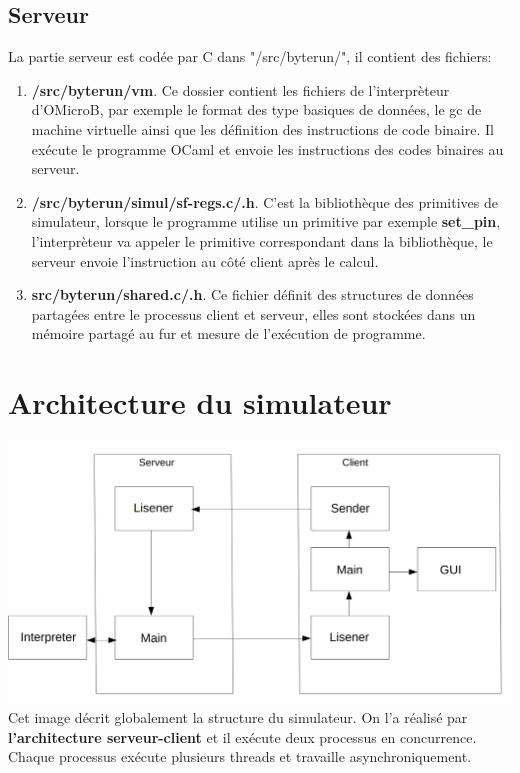\documentclass[14px]{article}
\begin{document}
\subsection{Serveur}
La partie serveur est codée par C dans "/src/byterun/", il contient des fichiers:
\begin{enumerate}
\item \textbf{/src/byterun/vm}. 
Ce dossier contient les fichiers de l'interprèteur d'OMicroB, par exemple le format des type basiques de données, le gc de machine virtuelle ainsi que les définition des instructions de code binaire. Il exécute le programme OCaml et envoie les instructions des codes binaires au serveur.

\item \textbf{/src/byterun/simul/sf-regs.c/.h}. 
C'est la bibliothèque des primitives de simulateur, lorsque le programme utilise un primitive par exemple \textbf{set\_pin}, l'interprèteur va appeler le primitive correspondant dans la bibliothèque, le serveur envoie l'instruction au côté client après le calcul.

\item \textbf{src/byterun/shared.c/.h}. 
Ce fichier définit des structures de données partagées
entre le processus client et serveur, elles sont stockées dans un mémoire partagé au fur et mesure de l'exécution de programme.
\end{enumerate}


\clearpage
\pagestyle{fancy}
\rhead{\thepage}
\fancyfoot{}
\section{Architecture du simulateur}
\includegraphics[width=\textwidth]{simulator.png}\\[1cm]
Cet image décrit globalement la structure du simulateur. On l'a réalisé par \textbf{l'architecture serveur-client} et il exécute deux processus en concurrence. Chaque processus exécute plusieurs threads et travaille asynchroniquement.\\
\end{document}
